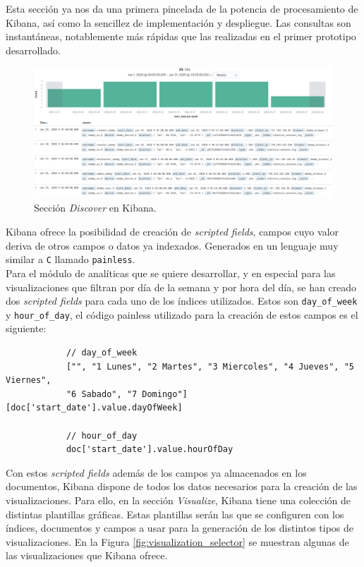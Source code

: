 \documentclass[a4paper, 12pt]{book}
\begin{document}
		Esta sección ya nos da una primera pincelada de la potencia de procesamiento de Kibana, así como la sencillez de implementación y despliegue. Las consultas son instantáneas, notablemente más rápidas que las realizadas en el primer prototipo desarrollado.\\
		
		\begin{figure}[H]
			\centering
			\includegraphics[width=15cm, keepaspectratio]{img/discover_kibana.png}
			\caption{Sección \textit{Discover} en Kibana.}
			\label{fig:discover_kibana}
		\end{figure}
		
		Kibana ofrece la posibilidad de creación de \textit{scripted fields}, campos cuyo valor deriva de otros campos o datos ya indexados. Generados en un lenguaje muy similar a \texttt{C} llamado \texttt{painless}. \\
		
		Para el módulo de analíticas que se quiere desarrollar, y en especial para las visualizaciones que filtran por día de la semana y por hora del día, se han creado dos \textit{scripted fields} para cada uno de los índices utilizados. Estos son \texttt{day\_of\_week} y \texttt{hour\_of\_day}, el código painless utilizado para la creación de estos campos es el siguiente:
		
		{\footnotesize
		\begin{verbatim}
			// day_of_week
			["", "1 Lunes", "2 Martes", "3 Miercoles", "4 Jueves", "5 Viernes",
			"6 Sabado", "7 Domingo"] [doc['start_date'].value.dayOfWeek]
			
			// hour_of_day
			doc['start_date'].value.hourOfDay
		\end{verbatim}
		}
	
		Con estos \textit{scripted fields} además de los campos ya almacenados en los documentos, Kibana dispone de todos los datos necesarios para la creación de las visualizaciones. Para ello, en la sección \textit{Visualize}, Kibana tiene una colección de distintas plantillas gráficas. Estas plantillas serán las que se configuren con los índices, documentos y campos a usar para la generación de los distintos tipos de visualizaciones. En la Figura \ref{fig:visualization_selector} se muestran algunas de las visualizaciones que Kibana ofrece.
		
\end{document}
